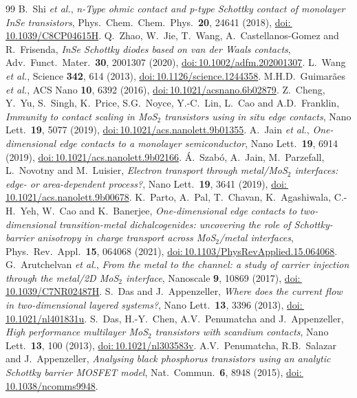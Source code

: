 \documentclass[11pt]{article}
\providecommand{\doi}[1]{\href{https://doi.org/#1}{doi:\,#1}}
\begin{document}
\begin{thebibliography}{99}
 B.~Shi \textit{et al.}, \textit{n-Type ohmic contact and p-type Schottky contact of monolayer InSe transistors}, Phys.\ Chem.\ Chem.\ Phys.\ \textbf{20}, 24641 (2018), \doi{10.1039/C8CP04615H}.
 Q.~Zhao, W.~Jie, T.~Wang, A.~Castellanos-Gomez and R.~Frisenda, \textit{InSe Schottky diodes based on van der Waals contacts}, Adv.\ Funct.\ Mater.\ \textbf{30}, 2001307 (2020), \doi{10.1002/adfm.202001307}.
 L.~Wang \textit{et al.}, Science \textbf{342}, 614 (2013), \doi{10.1126/science.1244358}.
 M.H.D.~Guimar\~aes \textit{et al.}, ACS Nano \textbf{10}, 6392 (2016), \doi{10.1021/acsnano.6b02879}.
 Z.~Cheng, Y.~Yu, S.~Singh, K.~Price, S.G.~Noyce, Y.-C.~Lin, L.~Cao and A.D.~Franklin, \textit{Immunity to contact scaling in MoS$_2$ transistors using in situ edge contacts}, Nano Lett.\ \textbf{19}, 5077 (2019), \doi{10.1021/acs.nanolett.9b01355}.
 A.~Jain \textit{et al.}, \textit{One-dimensional edge contacts to a monolayer semiconductor}, Nano Lett.\ \textbf{19}, 6914 (2019), \doi{10.1021/acs.nanolett.9b02166}.
 \'A.~Szab\'o, A.~Jain, M.~Parzefall, L.~Novotny and M.~Luisier, \textit{Electron transport through metal/MoS$_2$ interfaces: edge- or area-dependent process?}, Nano Lett.\ \textbf{19}, 3641 (2019), \doi{10.1021/acs.nanolett.9b00678}.
 K.~Parto, A.~Pal, T.~Chavan, K.~Agashiwala, C.-H.~Yeh, W.~Cao and K.~Banerjee, \textit{One-dimensional edge contacts to two-dimensional transition-metal dichalcogenides: uncovering the role of Schottky-barrier anisotropy in charge transport across MoS$_2$/metal interfaces}, Phys.\ Rev.\ Appl.\ \textbf{15}, 064068 (2021), \doi{10.1103/PhysRevApplied.15.064068}.
 G.~Arutchelvan \textit{et al.}, \textit{From the metal to the channel: a study of carrier injection through the metal/2D MoS$_2$ interface}, Nanoscale \textbf{9}, 10869 (2017), \doi{10.1039/C7NR02487H}.
 S.~Das and J.~Appenzeller, \textit{Where does the current flow in two-dimensional layered systems?}, Nano Lett.\ \textbf{13}, 3396 (2013), \doi{10.1021/nl401831u}.
 S.~Das, H.-Y.~Chen, A.V.~Penumatcha and J.~Appenzeller, \textit{High performance multilayer MoS$_2$ transistors with scandium contacts}, Nano Lett.\ \textbf{13}, 100 (2013), \doi{10.1021/nl303583v}.
 A.V.~Penumatcha, R.B.~Salazar and J.~Appenzeller, \textit{Analysing black phosphorus transistors using an analytic Schottky barrier MOSFET model}, Nat.\ Commun.\ \textbf{6}, 8948 (2015), \doi{10.1038/ncomms9948}.

\end{thebibliography}
\end{document}
